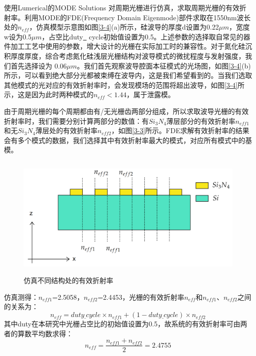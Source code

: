 \documentclass[UTF8,a4paper,12pt]{ctexart}
\numberwithin{equation}{section}
\begin{document}
使用Lumerical的MODE Solutions
对周期光栅进行仿真，求取周期光栅的有效折射率。利用MODE的FDE(Frequency Domain Eigenmode)部件求取在1550nm波长处的$n_{eff}$，仿真模型示意图如图\ref{3-4}(a)所示，硅波导的厚度d设置为0.22$\mu m$，宽度w设为0.5$\mu  m$，占空比duty\underline{~} cycle初始值设置为0.5。上述参数的选择取自常见的器件加工工艺中使用的参数，增大设计的光栅在实际加工时的兼容性。对于氮化硅沉积厚度厚度，综合考虑氮化硅浅层光栅结构对波导模式的微扰程度与发射强度，我们首先选择设为 0.06$\mu m$。我们首先观察波导腔面本征模式的光场图，如图\ref{3-4}(b)所示，可以看到绝大部分光都被束缚在波导内，这是我们希望看到的。当我们选取其他模式的光对应的有效折射率时，会发现模场的范围将超出波导，如图\ref{3-4}所示，这是因为此时两种模式的$n_{eff}<1.44$，属于泄露模。




由于周期光栅的每个周期都由有/无光栅齿两部分组成，所以求取波导光栅的有效折射率时，我们需要分别计算两部分的数值：有$Si_3 N_4$薄层部分的有效折射率$n_{eff1}$和无$Si_3 N_4$薄层处的有效折射率$n_{eff2}$，如图\ref{3-3}所示。FDE求解有效折射率的结果会有多个模式的数据，我们选择其中有效折射率最大的模式，对应所有模式中的基模。



\begin{figure}[htbp]
    \centering
\includegraphics[height=6cm,width=12cm]{fig33.png}
    \caption{仿真不同结构处的有效折射率}
    \label{3-5}
\end{figure}
仿真测得：$n_{eff1}$=2.5058，$n_{eff2}$=2.4453，光栅的有效折射率$n_{eff}$和$n_{eff1}$、$n_{eff2}$之间的关系为：
\begin{equation}
    n_{eff} = duty\underline{~}cycle\times n_{eff1} + (1-duty\underline{~}cycle)\times n_{eff2}
    \label{eq3-1}
\end{equation}
其中duty\enspace 在本研究中光栅占空比的初始值设置为0.5，故系统的有效折射率可由两者的算数平均数求得：
\begin{equation*}
    n_{eff} = \frac{n_{eff1} + n_{eff2}}{2} = 2.4755
\end{equation*}
\end{document}
